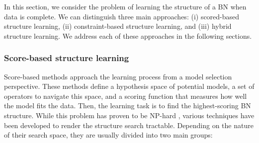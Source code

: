 In this section, we consider the problem of learning the structure of a BN when data is complete. We can distinguish three main approaches: (i) scored-based structure learning, (ii) constraint-based structure learning, and (iii) hybrid structure learning. We address each of these approaches in the following sections.

\subsubsection{Score-based structure learning} \label{sec:2_score_based_structure_learning}
Score-based methods approach the learning process from a model selection perspective. These methods define a hypothesis space of potential models, a set of operators to navigate this space, and a scoring function that measures how well the model fits the data. Then, the learning task is to find the highest-scoring BN structure. While this problem has proven to be NP-hard \citep{chickering1996struct,chickering2004struct}, various techniques have been developed to render the structure search tractable. Depending on the nature of their search space, they are usually divided into two main groups:

